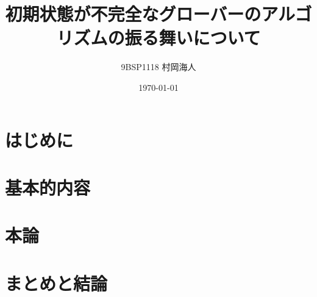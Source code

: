 \documentclass[platex,dvipdfmx, titlepage]{jlreq}			%
\title{初期状態が不完全なグローバーのアルゴリズムの振る舞いについて}
\author{9BSP1118 村岡海人}
\date{\today}
\begin{document}
\maketitle
\tableofcontents
\clearpage

\makeatletter
\renewcommand{\theequation}{%
\thesection.\arabic{equation}}
\makeatother

\section{はじめに}


\section{基本的内容}


\section{本論}



\section{まとめと結論}






\end{document}

